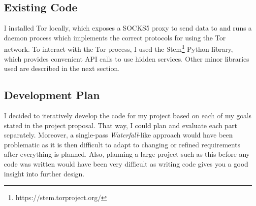 \documentclass[diss.tex]{subfiles}
\begin{document}
\subsection{Existing Code}
I installed Tor locally, which exposes a SOCKS5 proxy to send data to and runs a daemon process which implements the correct protocols for using the Tor network. To interact with the Tor process, I used the Stem\footnote{https://stem.torproject.org/} Python library, which provides convenient API calls to use hidden services. Other minor libraries used are described in the next section.

\subsection{Development Plan}
I decided to iteratively develop the code for my project based on each of my goals stated in the project proposal. That way, I could plan and evaluate each part separately. Moreover, a single-pass \textit{Waterfall}-like approach would have been problematic as it is then difficult to adapt to changing or refined requirements after everything is planned. Also, planning a large project such as this before any code was written would have been very difficult as writing code gives you a good insight into further design.
\end{document}
